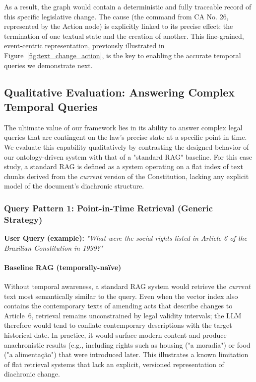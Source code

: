 \documentclass[11pt]{article}
\begin{document}
As a result, the graph would contain a deterministic and fully traceable record of this specific legislative change. The cause (the command from CA No. 26, represented by the Action node) is explicitly linked to its precise effect: the termination of one textual state and the creation of another. This fine-grained, event-centric representation, previously illustrated in Figure~\ref{fig:text_change_action}, is the key to enabling the accurate temporal queries we demonstrate next.

\subsection{Qualitative Evaluation: Answering Complex Temporal Queries}
\label{sec:evaluation}
The ultimate value of our framework lies in its ability to answer complex legal queries that are contingent on the law's precise state at a specific point in time. We evaluate this capability qualitatively by contrasting the designed behavior of our ontology-driven system with that of a "standard RAG" baseline. For this case study, a standard RAG is defined as a system operating on a flat index of text chunks derived from the \textit{current} version of the Constitution, lacking any explicit model of the document's diachronic structure.

\subsubsection*{Query Pattern 1: Point-in-Time Retrieval (Generic Strategy)}
\textbf{User Query (example):} \textit{"What were the social rights listed in Article 6 of the Brazilian Constitution in 1999?"}

\paragraph{Baseline RAG (temporally-naïve)}
Without temporal awareness, a standard RAG system would retrieve the \emph{current} text most semantically similar to the query. Even when the vector index also contains the contemporary texts of amending acts that describe changes to Article~6, retrieval remains unconstrained by legal validity intervals; the LLM therefore would tend to conflate contemporary descriptions with the target historical date. In practice, it would surface modern content and produce anachronistic results (e.g., including rights such as housing ("a moradia") or food ("a alimentação") that were introduced later. This illustrates a known limitation of flat retrieval systems that lack an explicit, versioned representation of diachronic change.
\end{document}
